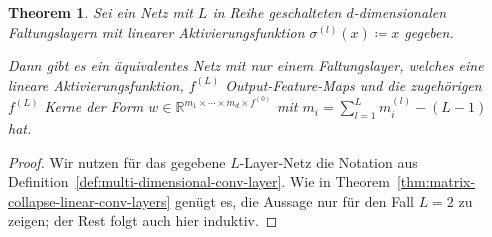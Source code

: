 \documentclass[paper=a4, 	%
		fontsize=11pt,
		abstract=true, 	%
		headsepline, 	%
		notitlepage	%
		]{scrartcl}
\newtheorem{theorem}{Theorem}[section]
\theoremstyle{definition}
\newcommand{\R}{\mathbb{R}}
\begin{document}
\begin{theorem}
    Sei ein Netz mit $L$ in Reihe geschalteten $d$-dimensionalen Faltungslayern  mit linearer Aktivierungsfunktion $\sigma^{(l)}(x) \coloneqq x$ gegeben.

    Dann gibt es ein äquivalentes Netz mit nur einem Faltungslayer, welches eine lineare Aktivierungsfunktion, $f^{(L)}$ Output-Feature-Maps  und die zugehörigen $f^{(L)}$ Kerne der Form $w\in\R^{m_1\times\cdots\times m_d \times f^{(0)}}$ mit $m_i=\sum_{l=1}^L m^{(l)}_i - (L-1)$ hat.
\end{theorem}
\begin{proof}
    Wir nutzen für das gegebene $L$-Layer-Netz die Notation aus Definition~\ref{def:multi-dimensional-conv-layer}.
    Wie in Theorem~\ref{thm:matrix-collapse-linear-conv-layers} genügt es, die Aussage nur für den Fall $L=2$ zu zeigen; der Rest folgt auch hier induktiv.


\end{proof}
\end{document}
